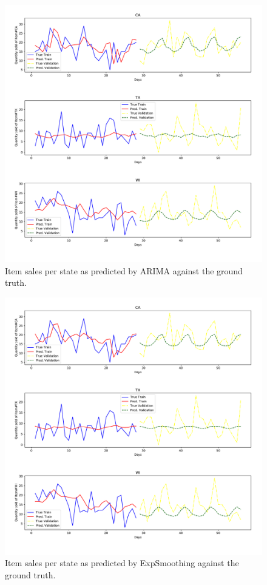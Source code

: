 \documentclass[12pt]{article}
\begin{document}
\begin{figure}[H]
  \centering
  \includegraphics[width=.8\linewidth]{sarimax-state}
  \caption{Item sales per state as predicted by ARIMA against the ground truth.}
  \label{fig:arima-state-sales}
\end{figure}

\begin{figure}[H]
  \centering
  \includegraphics[width=.8\linewidth]{exp-sm-state}
  \caption{Item sales per state as predicted by ExpSmoothing against the ground truth.}
  \label{fig:expsm-state-sales}
\end{figure}
\end{document}
